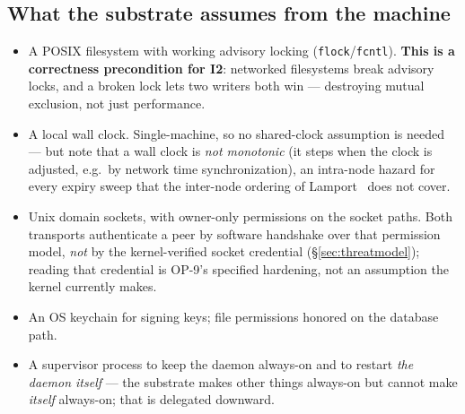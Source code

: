 \documentclass[11pt,a4paper]{article}
\theoremstyle{definition}
\theoremstyle{remark}
\begin{document}
\subsection{What the substrate assumes from the machine}
\begin{itemize}[leftmargin=1.4em]
  \item A POSIX filesystem with working advisory locking (\texttt{flock}/\texttt{fcntl}).
  \textbf{This is a correctness precondition for I2}: networked filesystems break
  advisory locks, and a broken lock lets two writers both win --- destroying mutual
  exclusion, not just performance.
  \item A local wall clock. Single-machine, so no shared-clock assumption is needed
%
  --- but note that a wall clock is \emph{not monotonic} (it steps when the clock is
  adjusted, e.g.\ by network time synchronization), an intra-node hazard for every
  expiry sweep that the inter-node ordering of Lamport~ does not
  cover.
  \item Unix domain sockets, with owner-only permissions on the socket paths. Both
  transports authenticate a peer by software handshake over that permission model,
  \emph{not} by the kernel-verified socket credential (\S\ref{sec:threatmodel});
  reading that credential is OP-9's specified hardening, not an assumption the
  kernel currently makes.
  \item An OS keychain for signing keys; file permissions honored on the database
  path.
  \item A supervisor process to keep the daemon always-on and to restart \emph{the
  daemon itself} --- the substrate makes other things always-on but cannot make
  \emph{itself} always-on; that is delegated downward.
\end{itemize}
\end{document}
